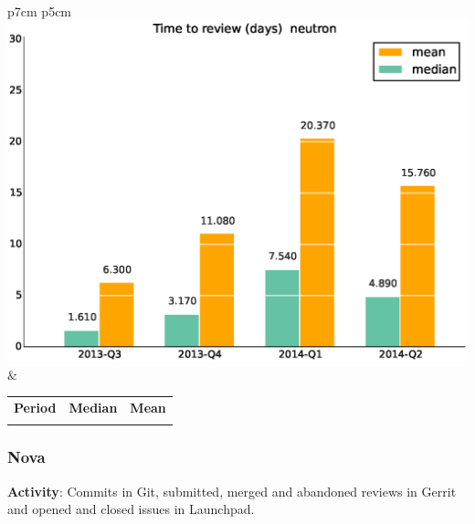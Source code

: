 \documentclass[a4wide,11pt]{report}
\begin{document}
\begin{tabular}{p{7cm} p{5cm}}
    \vspace{0pt} 
    \includegraphics[scale=.35]{figs/timetoreview_medianneutron.eps}
    & 
    \vspace{0pt}
    \begin{tabular}{l|r|r|}%
    \bfseries Period & \bfseries Median & \bfseries Mean %
    \csvreader[head to column names]{data/timetoreview_medianneutron.csv}{}%
    {\\ & \mediantime & \meantime}
    \end{tabular}
\end{tabular}

\newpage 
 \subsubsection{Nova}

\textbf{Activity}: Commits in Git, submitted, merged and abandoned reviews in Gerrit and opened and closed issues in Launchpad.
\end{document}
